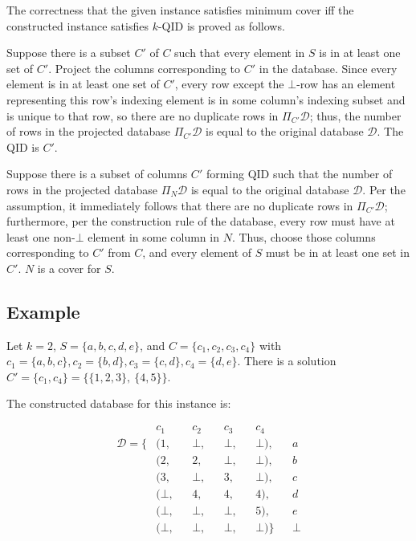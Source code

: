 \documentclass[12pt]{llncs}
\newcommand{\cD}{\mathcal{D}}
\newcommand{\Proj}[1]{\Pi_{#1}}
\begin{document}
The correctness that the given instance satisfies minimum cover iff the constructed instance satisfies $k$-QID is proved as follows.

Suppose there is a subset $C'$ of $C$ such that every element in $S$ is in at least one set of $C'$. Project the columns corresponding to $C'$ in the database. Since every element is in at least one set of $C'$, every row except the $\bot$-row has an element representing this row's indexing element is in some column's indexing subset and is unique to that row, so there are no duplicate rows in $\Proj{C'} \cD$; thus, the number of rows in the projected database $\Proj{C'} \cD$ is equal to the original database $\cD$. The QID is $C'$.

Suppose there is a subset of columns $C'$ forming QID such that the number of rows in the projected database $\Proj{N} \cD$ is equal to the original database $\cD$. Per the assumption, it immediately follows that there are no duplicate rows in $\Proj{C'} \cD$; furthermore, per the construction rule of the database, every row must have at least one non-$\bot$ element in some column in $N$. Thus, choose those columns corresponding to $C'$ from $C$, and every element of $S$ must be in at least one set in $C'$. $N$ is a cover for $S$.

\subsection{Example}
Let $k=2$, $S = \{a,b,c,d,e\}$, and $C = \{c_1,c_2,c_3,c_4\}$ with $c_1 = \{a,b,c\}, c_2 = \{b,d\}, c_3 = \{c,d\}, c_4 = \{d,e\}$. There is a solution $C' = \{c_1,c_4\} = \{\{1,2,3\},~\{4,5\}\}$.

The constructed database for this instance is:

\begin{align*}
                 &  c_1   && c_2   && c_3   && c_4     &&\\
\mathcal{D} = \{ & (1,    && \bot, && \bot, && \bot),  && a\\
                 & (2,    && 2,    && \bot, && \bot),  && b\\
                 & (3,    && \bot, && 3,    && \bot),  && c\\
                 & (\bot, && 4,    && 4,    && 4   ),  && d\\
                 & (\bot, && \bot, && \bot, && 5   ),  && e\\
                 & (\bot, && \bot, && \bot, && \bot)\} && \bot\\
\end{align*}
\end{document}
